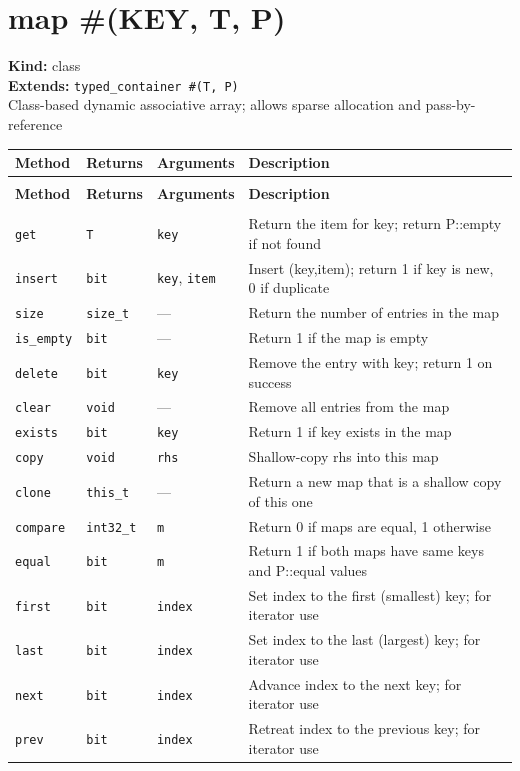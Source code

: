 \documentclass[11pt,letterpaper]{report}
\begin{document}
\section{map \#(KEY, T, P)}
\label{cls:mapKEYTP}

\noindent\textbf{Kind:} class\\
\noindent\textbf{Extends:} \texttt{typed\_container \#(T, P)}\\
\noindent Class-based dynamic associative array; allows sparse allocation and pass-by-reference

\begin{xltabular}{\linewidth}{>{\small}p{1.35in} >{\small}p{1.25in} >{\small}p{0.95in} >{\small}X}
\toprule
\textbf{Method} & \textbf{Returns} & \textbf{Arguments} & \textbf{Description} \\
\midrule
\endfirsthead
{} \\
\midrule
\textbf{Method} & \textbf{Returns} & \textbf{Arguments} & \textbf{Description} \\
\midrule
\endhead
\midrule
{} \\
\endfoot
\bottomrule
\endlastfoot
\texttt{get} & \texttt{T} & \texttt{key} & Return the item for key; return P::empty if not found \\
\texttt{insert} & \texttt{bit} & \texttt{key}, \texttt{item} & Insert (key,item); return 1 if key is new, 0 if duplicate \\
\texttt{size} & \texttt{size\_t} & --- & Return the number of entries in the map \\
\texttt{is\_empty} & \texttt{bit} & --- & Return 1 if the map is empty \\
\texttt{delete} & \texttt{bit} & \texttt{key} & Remove the entry with key; return 1 on success \\
\texttt{clear} & \texttt{void} & --- & Remove all entries from the map \\
\texttt{exists} & \texttt{bit} & \texttt{key} & Return 1 if key exists in the map \\
\texttt{copy} & \texttt{void} & \texttt{rhs} & Shallow-copy rhs into this map \\
\texttt{clone} & \texttt{this\_t} & --- & Return a new map that is a shallow copy of this one \\
\texttt{compare} & \texttt{int32\_t} & \texttt{m} & Return 0 if maps are equal, 1 otherwise \\
\texttt{equal} & \texttt{bit} & \texttt{m} & Return 1 if both maps have same keys and P::equal values \\
\texttt{first} & \texttt{bit} & \texttt{index} & Set index to the first (smallest) key; for iterator use \\
\texttt{last} & \texttt{bit} & \texttt{index} & Set index to the last (largest) key; for iterator use \\
\texttt{next} & \texttt{bit} & \texttt{index} & Advance index to the next key; for iterator use \\
\texttt{prev} & \texttt{bit} & \texttt{index} & Retreat index to the previous key; for iterator use \\
\end{xltabular}
\end{document}
